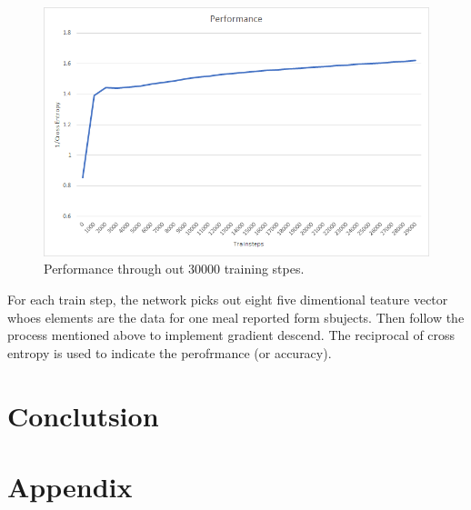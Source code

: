 \documentclass{article}
\begin{document}
\begin{spacing}{2}
    \begin{figure}[H]
        \centering 
        \includegraphics[width=1\textwidth]{Performance}
        \caption{Performance through out 30000 training stpes.\cite{Performance}}
        \end{figure}
  
    \noindent For each train step, the network picks out eight five dimentional teature vector whoes elements are the data for one meal reported form sbujects. Then follow the process mentioned above to implement gradient descend. The reciprocal of cross entropy is used to indicate the perofrmance (or accuracy). 

    

    \section{Conclutsion}


    \section{Appendix}


\end{spacing}
\end{document}
